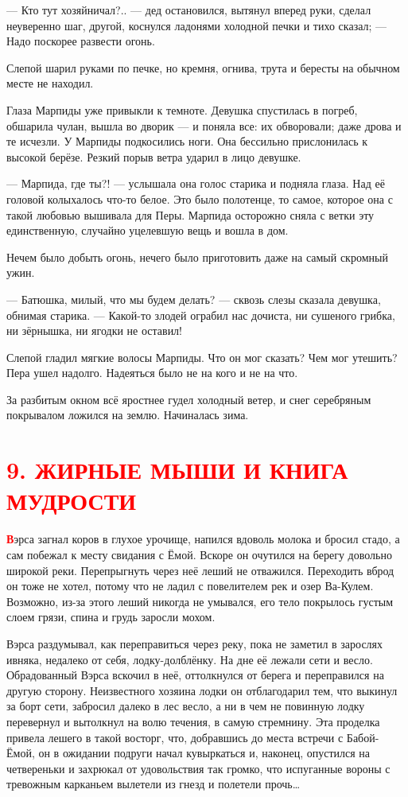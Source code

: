 \documentclass[12pt, a4paper, openany]{book}
\begin{document}
	— Кто тут хозяйничал?.. — дед остановился, вытянул вперед руки, сделал неуверенно шаг, другой, коснулся ладонями холодной печки и тихо сказал; — Надо поскорее развести огонь.
	
	Слепой шарил руками по печке, но кремня, огнива, трута и бересты на обычном месте не находил.
	
	Глаза Марпиды уже привыкли к темноте. Девушка спустилась в погреб, обшарила чулан, вышла во дворик — и поняла все: их обворовали; даже дрова и те исчезли. У Марпиды подкосились ноги. Она бессильно прислонилась к высокой берёзе. Резкий порыв ветра ударил в лицо девушке.
	
	— Марпида, где ты?! — услышала она голос старика и подняла глаза. Над её головой колыхалось что-то белое. Это было полотенце, то самое, которое она с такой любовью вышивала для Перы. Марпида осторожно сняла с ветки эту единственную, случайно уцелевшую вещь и вошла в дом.
	
	Нечем было добыть огонь, нечего было приготовить даже на самый скромный ужин.
	
	— Батюшка, милый, что мы будем делать? — сквозь слезы сказала девушка, обнимая старика. — Какой-то злодей ограбил нас дочиста, ни сушеного грибка, ни зёрнышка, ни ягодки не оставил!
	
	Слепой гладил мягкие волосы Марпиды. Что он мог сказать? Чем мог утешить? Пера ушел надолго. Надеяться было не на кого и не на что.
	
	За разбитым окном всё яростнее гудел холодный ветер, и снег серебряным покрывалом ложился на землю. Начиналась зима.
	
	\section[9. Жирные мыши и Книга мудрости]{\center \textcolor{red}{9. ЖИРНЫЕ МЫШИ И КНИГА МУДРОСТИ}}
	
	
	\lettrine[findent=0pt]{\textbf{\textcolor{red}{В}}}{}эрса загнал коров в глухое урочище, напился вдоволь молока и бросил стадо, а сам побежал к месту свидания с Ёмой. Вскоре он очутился на берегу довольно широкой реки. Перепрыгнуть через неё леший не отважился. Переходить вброд он тоже не хотел, потому что не ладил с повелителем рек и озер Ва-Кулем. Возможно, из-за этого леший никогда не умывался, его тело покрылось густым слоем грязи, спина и грудь заросли мохом.
	
	Вэрса раздумывал, как переправиться через реку, пока не заметил в зарослях ивняка, недалеко от себя, лодку-долблёнку. На дне её лежали сети и весло. Обрадованный Вэрса вскочил в неё, оттолкнулся от берега и переправился на другую сторону. Неизвестного хозяина лодки он отблагодарил тем, что выкинул за борт сети, забросил далеко в лес весло, а ни в чем не повинную лодку перевернул и вытолкнул на волю течения, в самую стремнину. Эта проделка привела лешего в такой восторг, что, добравшись до места встречи с Бабой-Ёмой, он в ожидании подруги начал кувыркаться и, наконец, опустился на четвереньки и захрюкал от удовольствия так громко, что испуганные вороны с тревожным карканьем вылетели из гнезд и полетели прочь…
	
\end{document}
